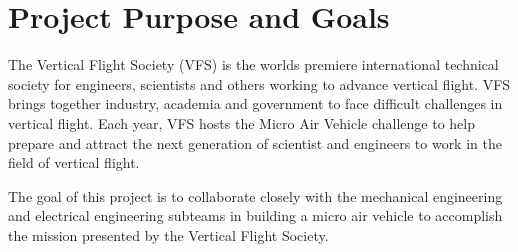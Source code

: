 \documentclass[onecolumn, oneside, letterpaper, draftclsnofoot, 10pt, compsoc]{IEEEtran}
\begin{document}
\begin{titlepage}
\begin{singlespace}
\begin{abstract}
        \noindent
        This progress report outlines the overall functionalities of OSU\textquotesingle s Micro-Air Vehicle (MAV) system. It outlines the devices that are installed on the MAV, and how the data is received, organized, and displayed on the user interface built by our team. Each component for the project is explained in depth, starting with the Graphical User Interface (GUI), WiFi data transmitter, camera feeds, and sensor data. The web application currently contains all necessary functionality, and the product is ready for pilot consumption. Each facet of the MAV's software is covered in this document.
        \end{abstract}
    \end{singlespace}
\end{titlepage}
\newpage
{}
\tableofcontents
\listoffigures
\clearpage

\section{Project Purpose and Goals}
The Vertical Flight Society (VFS) is the world\textquotesingle s premiere international technical society for engineers, scientists and others working to advance vertical flight. VFS brings together industry, academia and government to face difficult challenges in vertical flight. Each year, VFS hosts the Micro Air Vehicle challenge to help prepare and attract the next generation of scientist and engineers to work in the field of vertical flight.

\noindent
\newline
The goal of this project is to collaborate closely with the mechanical engineering and electrical engineering subteams in building a micro air vehicle to accomplish the mission presented by the Vertical Flight Society.


\end{document}
